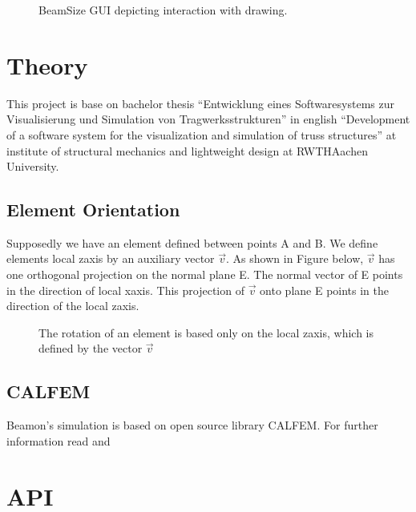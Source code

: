 \documentclass[letterpaper,10pt,english]{sphinxmanual}
\begin{document}
\begin{figure}[htbp]
\centering
\capstart

\noindent{}
\caption{BeamSize GUI depicting interaction with drawing.}\label{\detokenize{making_a_model:id23}}\end{figure}


\section{Theory}
\label{\detokenize{theory:theory}}\label{\detokenize{theory::doc}}
This project is base on bachelor thesis “Entwicklung eines Softwaresystems zur Visualisierung und Simulation von
Tragwerksstrukturen” in english “Development of a software system for the visualization and simulation of truss
structures” at institute of structural mechanics and lightweight design at RWTH\sphinxhyphen{}Aachen University.


\subsection{Element Orientation}
\label{\detokenize{theory:element-orientation}}
Supposedly we have an element defined between points A and B.
We define elements local z\sphinxhyphen{}axis by an auxiliary vector \(\vec{v}\). As shown in Figure below, \(\vec{v}\) has one
orthogonal projection on the normal plane E. The normal vector of E points in the direction
of local x\sphinxhyphen{}axis. This projection of \(\vec{v}\) onto plane E points in the direction of the local z\sphinxhyphen{}axis.

\begin{figure}[htbp]
\centering
\capstart

\noindent{}
\caption{The rotation of an element is based only on the local z\sphinxhyphen{}axis, which is defined by the vector \(\vec{v}\)}\label{\detokenize{theory:id1}}\end{figure}


\subsection{CALFEM}
\label{\detokenize{theory:calfem}}
Beamon’s simulation is based on open source library CALFEM. For further information read
 and


\section{API}
\label{\detokenize{api:api}}\label{\detokenize{api::doc}}
\end{document}
